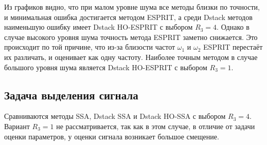 \documentclass[specialist,
  substylefile=spbu_report.rtx,
subf,href,colorlinks=true, 12pt]{disser}
\theoremstyle{plain}
\theoremstyle{definition}
\theoremstyle{remark}
\begin{document}
Из графиков видно, что при малом уровне шума все методы близки по
точности, и минимальная ошибка достигается методом ESPRIT, а среди
Dstack методов наименьшую ошибку имеет Dstack HO-ESPRIT с выбором $R_3=4$.
Однако в случае высокого уровня шума точность метода ESPRIT заметно снижается.
Это происходит по той причине, что из-за близости частот $\omega_1$ и
$\omega_2$ ESPRIT
перестаёт их различать, и оценивает как одну частоту.
Наиболее точным методом в случае большого уровня шума является Dstack
HO-ESPRIT с выбором $R_3=1$.

\subsection{Задача выделения сигнала}\label{subsec:dstack-signal}
Сравниваются методы SSA, Dstack SSA и Dstack
HO-SSA с выбором $R_3=4$.
Вариант $R_3=1$ не рассматривается, так как в этом случае, в отличие от задачи
оценки параметров, у оценки сигнала возникает большое смещение.
\end{document}
